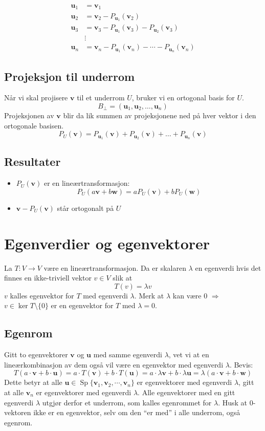 \documentclass[12pt,a4paper,norsk]{article}
\DeclareMathOperator{\Sp}{Sp} %
\newcommand{\vv}{\textbf{v}}
\newcommand{\vw}{\textbf{w}}
\newcommand{\vu}{\textbf{u}}
\begin{document}
\begin{align*}
  \vu_{1} &= \vv_{1} \\
  \vu_{2} &= \vv_{2} - P_{\vu_{1}}(\vv_{2}) \\
  \vu_{3} &= \vv_{3} - P_{\vu_{1}}(\vv_{3}) - P_{\vu_{2}}(\vv_{3}) \\
          &\vdots \\
  \vu_{n} &= \vv_{n} - P_{\vu_{1}}(\vv_{n}) - \cdots - P_{\vu_{n}}(\vv_{n})
\end{align*}

\subsection{Projeksjon til underrom}
Når vi skal projisere $\vv$ til et underrom $U$, bruker vi en ortogonal basis
for $U$.
\[B_{\perp} = (\vu_{1}, \vu_{2}, \ldots, \vu_{n})\]
Projeksjonen av $\vv$ blir da lik summen av projeksjonene ned på hver vektor i
den ortogonale basisen.
\[P_{U}(\vv) = P_{\vu_{1}}(\vv) + P_{\vu_{2}}(\vv) + \ldots + P_{\vu_{n}}(\vv)\]

\subsection{Resultater}
\begin{itemize}
\item $P_{U}(\vv)$ er en lineærtransformasjon:
\[P_{U}(a\vv + b\vw) = aP_{U}(\vv) + bP_{U}(\vw)\]
\item $\vv-P_{U}(\vv)$ står ortogonalt på $U$
\end{itemize}

\section{Egenverdier og egenvektorer}
La $T:V\rightarrow V$ være en lineærtransformasjon. Da er skalaren $\lambda$ en
egenverdi hvis det finnes en ikke-triviell vektor $v \in V$ slik at
\[T(v) = \lambda v\]
$v$ kalles egenvektor for $T$ med egenverdi $\lambda$.
Merk at $\lambda$ kan være 0 $\Longrightarrow$ $v \in \ker T\setminus\{0\}$ er en egenvektor for
$T$ med $\lambda = 0$.

\subsection{Egenrom}
Gitt to egenvektorer $\vv$ og $\vu$ med samme egenverdi $\lambda$, vet vi at en
lineærkombinasjon av dem også vil være en egenvektor med egenverdi $\lambda$. Bevis:
\[T(a \cdot \vv + b \cdot \vu) = a \cdot T(\vv) + b \cdot T(\vu) = a \cdot \lambda \vv + b \cdot \lambda \vu = \lambda(a \cdot \vv + b \cdot \vw)\]
Dette betyr at alle $\vu \in \Sp\{\vv_{1}, \vv_{2}, \cdots, \vv_{n}\}$ er egenvektorer med
egenverdi $\lambda$, gitt at alle $\vv_{n}$ er egenvektorer med egenverdi $\lambda$.
Alle egenvektorer med en gitt egenverdi $\lambda$ utgjør derfor et underrom, som
kalles egenrommet for $\lambda$. Husk at 0-vektoren ikke er en egenvektor, selv om den
``er med'' i alle underrom, også egenrom.
\end{document}

